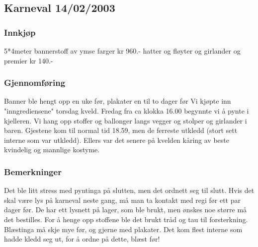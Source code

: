 \subsection{Karneval 14/02/2003}

\subsubsection{Innkjøp}
5*4meter bannerstoff av ymse farger kr 960.-
hatter og fløyter og girlander og premier kr 140.-

\subsubsection{Gjennomføring}
Banner ble hengt opp en uke før, plakater en til to dager før
Vi kjøpte inn "inngrediensene" torsdag kveld. Fredag fra ca klokka
16.00 begynnte vi å pynte i  kjelleren. Vi hang opp stoffer og
ballonger langs vegger og  stolper og girlander i baren. 
Gjestene kom til normal tid 18.59, men de ferreste utkledd (stort sett
interne som var utkledd).  Ellers var det senere på kvelden kåring av
beste kvindelig og  mannlige kostyme. 

\subsubsection{Bemerkninger}
Det ble litt stress med pyntinga på slutten, men det
ordnett seg til slutt. Hvis det skal være lys på karneval neste gang,
må man ta kontakt med regi før ett par dager før. De har ett lysnett
på lager, som ble brukt, men ønskes noe større må det bestilles. For å
henge opp stoffene ble det brukt tråd og tau til
forsterkning. Blæstinga må skje mye før, og gjerne med plakater. Det
kom flest interne som hadde kledd seg ut, for å ordne på dette, blæst
før!
